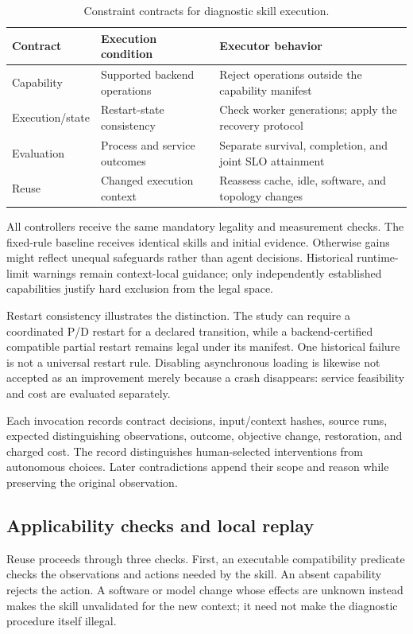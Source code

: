 \documentclass[preprint,12pt]{elsarticle}
\begin{document}
\begin{table}[htbp]
\centering\small
\begin{tabularx}{\linewidth}{@{}>{\raggedright\arraybackslash}p{29mm}YY@{}}
\toprule
Contract & Execution condition & Executor behavior \\
\midrule
Capability & Supported backend operations & Reject operations outside the capability manifest \\
Execution/state & Restart-state consistency & Check worker generations; apply the recovery protocol \\
Evaluation & Process and service outcomes & Separate survival, completion, and joint SLO attainment \\
Reuse & Changed execution context & Reassess cache, idle, software, and topology changes \\
\bottomrule
\end{tabularx}
\caption{Constraint contracts for diagnostic skill execution.}
\label{tab:contracts}
\end{table}

All controllers receive the same mandatory legality and measurement checks. The fixed-rule baseline receives identical skills and initial evidence. Otherwise gains might reflect unequal safeguards rather than agent decisions. Historical runtime-limit warnings remain context-local guidance; only independently established capabilities justify hard exclusion from the legal space.

Restart consistency illustrates the distinction. The study can require a coordinated P/D restart for a declared transition, while a backend-certified compatible partial restart remains legal under its manifest. One historical failure is not a universal restart rule. Disabling asynchronous loading is likewise not accepted as an improvement merely because a crash disappears: service feasibility and cost are evaluated separately.

Each invocation records contract decisions, input/context hashes, source runs, expected distinguishing observations, outcome, objective change, restoration, and charged cost. The record distinguishes human-selected interventions from autonomous choices. Later contradictions append their scope and reason while preserving the original observation.

\subsection{Applicability checks and local replay}
Reuse proceeds through three checks. First, an executable compatibility predicate checks the observations and actions needed by the skill. An absent capability rejects the action. A software or model change whose effects are unknown instead makes the skill unvalidated for the new context; it need not make the diagnostic procedure itself illegal.
\end{document}
